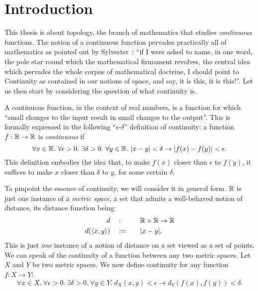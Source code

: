 \chapter{Introduction}\label{chap:intro}

This thesis is about topology, the branch of mathematics that studies \emph{continuous}
functions. The notion of a continuous function pervades practically all of mathematics as
pointed out by Sylvester~\cite[pg.~27]{armstrong-topology}: ``if I were asked to name, in
one word, the pole star round which the mathematical firmament revolves, the central idea
which pervades the whole corpus of mathematical doctrine, I should point to Continuity as
contained in our notions of space, and say, it is this, it is this!''. Let us then start
by considering the question of what continuity is.

A continuous function, in the context of real numbers, is a function for which ``small
changes to the input result in small changes to the output''. This is formally expressed
in the following ``$\epsilon$-$\delta$'' definition of continuity: a function $f : \mathbb{R}{} \rightarrow
\mathbb{R}{}$ is
\emph{continuous} if
\begin{equation*}\label{eq:cont-0}
  \forall x \in \mathbb{R}{}.~ \forall \epsilon > 0.~ \exists \delta > 0.~ \forall y \in \mathbb{R}{}.~
    | x - y | < \delta \rightarrow | f(x) - f(y) | < \epsilon.
\end{equation*}
This definition embodies the idea that, to make $f(x)$ closer than $\epsilon$ to
$f(y)$, it suffices to make $x$ closer than $\delta$ to $y$, for some certain $\delta$.

To pinpoint the essence of continuity, we will consider it in general form. $\mathbb{R}{}$ is
just one instance of a \emph{metric space}, a set that admits a well-behaved notion of
distance, its distance function being:
\begin{alignat*}{2}
  d              \quad&:\quad  && \mathbb{R}{} \times \mathbb{R}{} \rightarrow \mathbb{R}{} \\
  d(\langle x , y \rangle) \quad&:=\quad && | x - y |                      .
\end{alignat*}
This is just \emph{one} instance of a notion of distance on a set viewed as a set of
points. We can speak of the continuity of a function between any two metric spaces. Let
$X$ and $Y$ be two metric spaces. We now define continuity for any function $f : X \rightarrow Y$:
\begin{equation}\label{cont-1}
  \forall x \in X.~ \forall \epsilon > 0.~ \exists \delta > 0.~ \forall y \in Y.~ d_X(x, y) < \epsilon \rightarrow d_Y(f(x), f(y)) < \delta.
\end{equation}

